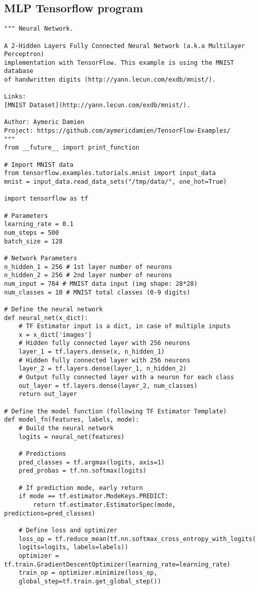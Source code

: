 \subsection{MLP Tensorflow program}
\begin{verbatim}
""" Neural Network.

A 2-Hidden Layers Fully Connected Neural Network (a.k.a Multilayer Perceptron)
implementation with TensorFlow. This example is using the MNIST database
of handwritten digits (http://yann.lecun.com/exdb/mnist/).

Links:
[MNIST Dataset](http://yann.lecun.com/exdb/mnist/).

Author: Aymeric Damien
Project: https://github.com/aymericdamien/TensorFlow-Examples/
"""
from __future__ import print_function

# Import MNIST data
from tensorflow.examples.tutorials.mnist import input_data
mnist = input_data.read_data_sets("/tmp/data/", one_hot=True)

import tensorflow as tf

# Parameters
learning_rate = 0.1
num_steps = 500
batch_size = 128

# Network Parameters
n_hidden_1 = 256 # 1st layer number of neurons
n_hidden_2 = 256 # 2nd layer number of neurons
num_input = 784 # MNIST data input (img shape: 28*28)
num_classes = 10 # MNIST total classes (0-9 digits)

# Define the neural network
def neural_net(x_dict):
	# TF Estimator input is a dict, in case of multiple inputs
	x = x_dict['images']
	# Hidden fully connected layer with 256 neurons
	layer_1 = tf.layers.dense(x, n_hidden_1)
	# Hidden fully connected layer with 256 neurons
	layer_2 = tf.layers.dense(layer_1, n_hidden_2)
	# Output fully connected layer with a neuron for each class
	out_layer = tf.layers.dense(layer_2, num_classes)
	return out_layer

# Define the model function (following TF Estimator Template)
def model_fn(features, labels, mode):
	# Build the neural network
	logits = neural_net(features)

	# Predictions
	pred_classes = tf.argmax(logits, axis=1)
	pred_probas = tf.nn.softmax(logits)

	# If prediction mode, early return
	if mode == tf.estimator.ModeKeys.PREDICT:
		return tf.estimator.EstimatorSpec(mode, predictions=pred_classes)

	# Define loss and optimizer
	loss_op = tf.reduce_mean(tf.nn.softmax_cross_entropy_with_logits(
	logits=logits, labels=labels))
	optimizer = tf.train.GradientDescentOptimizer(learning_rate=learning_rate)
	train_op = optimizer.minimize(loss_op,
	global_step=tf.train.get_global_step())


\end{verbatim}
